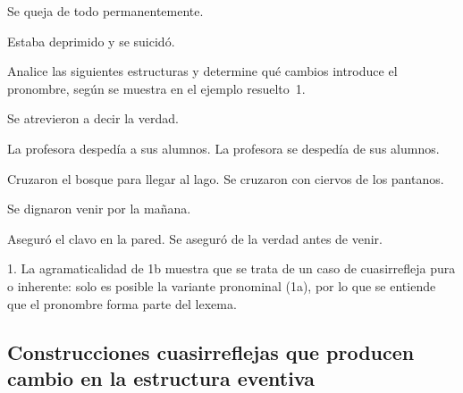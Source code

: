 \begin{exe}
  \ex
    \begin{xlist}
      \ex Se queja de todo permanentemente.
    \end{xlist}
  \ex
    \begin{xlist}
      \ex Estaba deprimido y se suicidó.
    \end{xlist}
\end{exe}

\begin{ejercicio}\label{ej:10-inherentes}
Analice las siguientes estructuras y determine qué cambios introduce el
pronombre, según se muestra en el ejemplo resuelto~1.

\begin{exe}
  \ex
    \begin{xlist}
      \ex Se atrevieron a decir la verdad.
    \end{xlist}
  \ex
    \begin{xlist}
      \ex La profesora despedía a sus alumnos.
      \ex La profesora se despedía de sus alumnos.
    \end{xlist}
  \ex
    \begin{xlist}
      \ex Cruzaron el bosque para llegar al lago.
      \ex Se cruzaron con ciervos de los pantanos.
    \end{xlist}
  \ex
    \begin{xlist}
      \ex Se dignaron venir por la mañana.
    \end{xlist}
  \ex
    \begin{xlist}
      \ex Aseguró el clavo en la pared.
      \ex Se aseguró de la verdad antes de venir.
    \end{xlist}
\end{exe}

\begin{resuelto}
1. La agramaticalidad de 1b muestra que se trata de un caso de cuasirrefleja
pura o inherente: solo es posible la variante pronominal (1a), por lo que se
entiende que el pronombre forma parte del lexema.
\end{resuelto}
\end{ejercicio}

\subsection{Construcciones cuasirreflejas que producen cambio en la estructura eventiva}\label{sec:10-ee}

